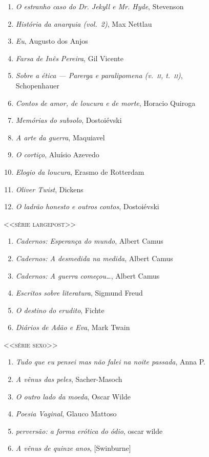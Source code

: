 \begin{enumerate}
\item \textit{O estranho caso do Dr. Jekyll e Mr. Hyde}, Stevenson
\item \textit{História da anarquia (vol.~2)}, Max Nettlau
\item \textit{Eu}, Augusto dos Anjos
\item \textit{Farsa de Inês Pereira}, Gil Vicente
\item \textit{Sobre a ética --- Parerga e paralipomena (v.~\textsc{ii}, t.~\textsc{ii})},\\ Schopenhauer 
\item \textit{Contos de amor, de loucura e de morte}, Horacio Quiroga
\item \textit{Memórias do subsolo}, Dostoiévski
\item \textit{A arte da guerra}, Maquiavel
\item \textit{O cortiço}, Aluísio Azevedo
\item \textit{Elogio da loucura}, Erasmo de Rotterdam
\item \textit{Oliver Twist}, Dickens
\item \textit{O ladrão honesto e outros contos}, Dostoiévski
\end{enumerate}\medskip


{\large\textsc{<<série largepost>>}}

\begin{enumerate}
\setlength\parskip{4.2pt}
\setlength\itemsep{-1.4mm}
\item \textit{Cadernos: Esperança do mundo}, Albert Camus
\item \textit{Cadernos: A desmedida na medida}, Albert Camus
\item \textit{Cadernos: A guerra começou\ldots}, Albert Camus
\item \textit{Escritos sobre literatura}, Sigmund Freud
\item \textit{O destino do erudito}, Fichte
\item \textit{Diários de Adão e Eva}, Mark Twain
\end{enumerate}


\medskip

{\large\textsc{<<série sexo>>}}

\begin{enumerate}
\setlength\parskip{4.2pt}
\setlength\itemsep{-1.4mm}

\item \textit{Tudo que eu pensei mas não falei na noite passada}, Anna P.
\item \textit{A vênus das peles}, Sacher{}-Masoch
\item \textit{O outro lado da moeda}, Oscar Wilde
\item \textit{Poesia Vaginal}, Glauco Mattoso 
\item \textit{perversão: a forma erótica do ódio}, oscar wilde
\item \textit{A vênus de quinze anos}, [Swinburne]

\end{enumerate}

